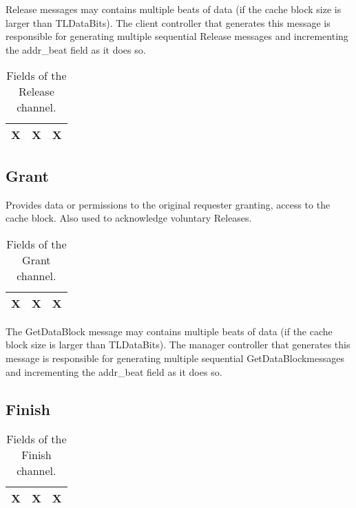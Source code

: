Release messages may contains multiple beats of data (if the cache block size is larger than TLDataBits).
The client controller that generates this message is responsible for generating multiple sequential Release messages and incrementing the addr\_beat field as it does so.

\begin{table}[ht]
\begin{center}
\begin{tabular}{|l|l|l|}
    \hline
    X&X&X\\
    \hline
\end{tabular}
\end{center}
\caption{Fields of the Release channel.}
\label{tab:release}
\end{table}

\subsection{Grant}

Provides data or permissions to the original requester granting, access to the cache block. Also used to acknowledge voluntary Releases.

\begin{table}[ht]
\begin{center}
\begin{tabular}{|l|l|l|}
    \hline
    X&X&X\\
    \hline
\end{tabular}
\end{center}
\caption{Fields of the Grant channel.}
\label{tab:grant}
\end{table}

The GetDataBlock message may contains multiple beats of data (if the cache block size is larger than TLDataBits).
The manager controller that generates this message is responsible for generating multiple sequential GetDataBlockmessages and incrementing the addr\_beat field as it does so.

\subsection{Finish}

\begin{table}[ht]
\begin{center}
\begin{tabular}{|l|l|l|}
    \hline
    X&X&X\\
    \hline
\end{tabular}
\end{center}
\caption{Fields of the Finish channel.}
\label{tab:finish}
\end{table}

